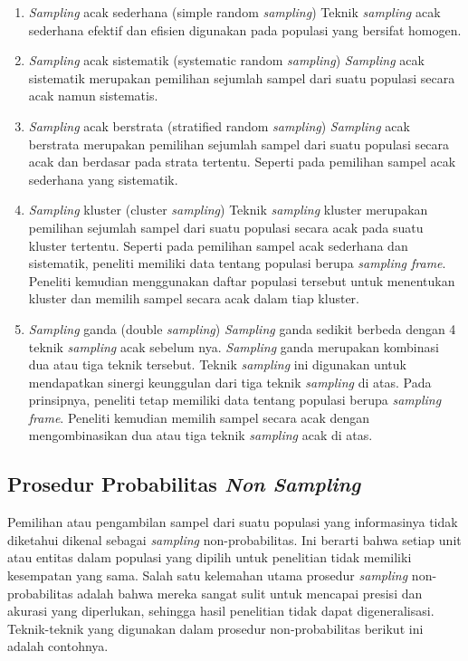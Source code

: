 \begin{enumerate}
	\item \textit{Sampling} acak sederhana (simple random \textit{sampling}) Teknik \textit{sampling} acak sederhana efektif dan efisien digunakan pada populasi yang bersifat homogen. 
	\item \textit{Sampling} acak sistematik (systematic random \textit{sampling}) \textit{Sampling} acak sistematik merupakan pemilihan sejumlah sampel dari suatu populasi secara acak namun sistematis. 
	\item \textit{Sampling} acak berstrata (stratified random \textit{sampling}) \textit{Sampling} acak berstrata merupakan pemilihan sejumlah sampel dari suatu populasi secara acak dan berdasar pada strata tertentu. Seperti pada pemilihan sampel acak sederhana yang sistematik. 
	\item \textit{Sampling} kluster (cluster \textit{sampling}) Teknik \textit{sampling} kluster merupakan pemilihan sejumlah sampel dari suatu populasi secara acak pada suatu kluster tertentu. Seperti pada pemilihan sampel acak sederhana dan sistematik, peneliti memiliki data tentang populasi berupa \textit{sampling frame}. Peneliti kemudian menggunakan daftar populasi tersebut untuk menentukan kluster dan memilih sampel secara acak dalam tiap kluster. 
	\item \textit{Sampling} ganda (double \textit{sampling}) \textit{Sampling} ganda sedikit berbeda dengan 4 teknik \textit{sampling} acak sebelum nya. \textit{Sampling} ganda merupakan kombinasi dua atau tiga teknik tersebut. Teknik \textit{sampling} ini digunakan untuk mendapatkan sinergi keunggulan dari tiga teknik \textit{sampling} di atas. Pada prinsipnya, peneliti tetap memiliki data tentang populasi berupa \textit{sampling frame}. Peneliti kemudian memilih sampel secara acak dengan mengombinasikan dua atau tiga teknik \textit{sampling} acak di atas.
\end{enumerate}

\subsection{Prosedur Probabilitas \textit{Non Sampling}}
Pemilihan atau pengambilan sampel dari suatu populasi yang informasinya tidak diketahui dikenal sebagai \textit{sampling} non-probabilitas. Ini berarti bahwa setiap unit atau entitas dalam populasi yang dipilih untuk penelitian tidak memiliki kesempatan yang sama. Salah satu kelemahan utama prosedur \textit{sampling} non-probabilitas adalah bahwa mereka sangat sulit untuk mencapai presisi dan akurasi yang diperlukan, sehingga hasil penelitian tidak dapat digeneralisasi. Teknik-teknik yang digunakan dalam prosedur non-probabilitas berikut ini adalah contohnya. 

